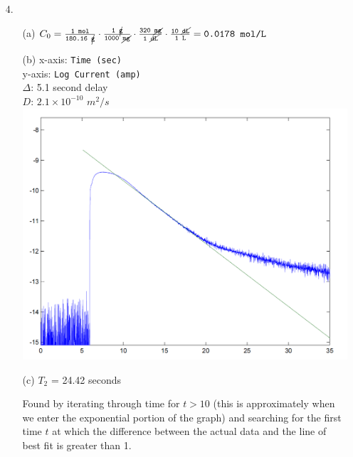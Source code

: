 \documentclass{article}
\begin{document}
\begin{enumerate}
\item[4.]
	\begin{enumerate}
	\item[(a)] 
		        $C_0 = \frac{\texttt{1 \text{mol}}}{\texttt{180.16 \cancel{\text{g}}}} \cdot \frac{\texttt{1 \cancel{\text{g}}}}{\texttt{1000 \cancel{\text{mg}}}} \cdot  \frac{\texttt{320 \cancel{\text{mg}}}}{\texttt{1 \cancel{\text{dL}}}} \cdot \frac{\texttt{10 \cancel{\text{dL}}}}{\texttt{1 \text{L}}} = \texttt{0.0178 \text{mol/L}}$
\bigskip
	\item[(b)] 
		        x-axis: \texttt{Time (sec)}\\
		        y-axis: \texttt{Log Current (amp)}\\
		        $\Delta$: 5.1 second delay\\
		        $D$: $2.1 \times 10^{-10}$ $m^2/s$\\
		        \includegraphics[width=\linewidth]{decay} 
\bigskip
	\item[(c)] 
		        $T_2$ = 24.42 seconds\
		        
		        Found by iterating through time for $t>10$ (this is approximately when we enter the exponential portion of the graph) and searching for the first time $t$ at which the difference between the actual data and the line of best fit is greater than 1.
	\end{enumerate}


\end{enumerate}
\end{document}

